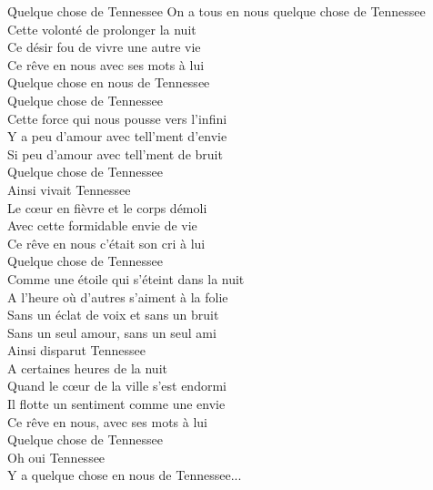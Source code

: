 \documentclass{novel}
\begin{document}
\newpage
\normalsize

\h*{Quelque chose de Tennessee}
On a tous en nous quelque chose de Tennessee \\
Cette volonté de prolonger la nuit \\
Ce désir fou de vivre une autre vie \\
Ce rêve en nous avec ses mots à lui \\
Quelque chose en nous de Tennessee \\

Quelque chose de Tennessee \\
Cette force qui nous pousse vers l'infini \\
Y a peu d'amour avec tell'ment d'envie \\
Si peu d'amour avec tell'ment de bruit \\
Quelque chose de Tennessee \\

Ainsi vivait Tennessee \\
Le cœur en fièvre et le corps démoli \\
Avec cette formidable envie de vie \\
Ce rêve en nous c'était son cri à lui \\
Quelque chose de Tennessee \\

Comme une étoile qui s'éteint dans la nuit \\
A l'heure où d'autres s'aiment à la folie \\
Sans un éclat de voix et sans un bruit \\
Sans un seul amour, sans un seul ami \\
Ainsi disparut Tennessee \\

A certaines heures de la nuit \\
Quand le cœur de la ville s'est endormi \\
Il flotte un sentiment comme une envie \\
Ce rêve en nous, avec ses mots à lui \\
Quelque chose de Tennessee \\
Oh oui Tennessee \\
Y a quelque chose en nous de Tennessee... \\

\newpage
\normalsize
\end{document}
